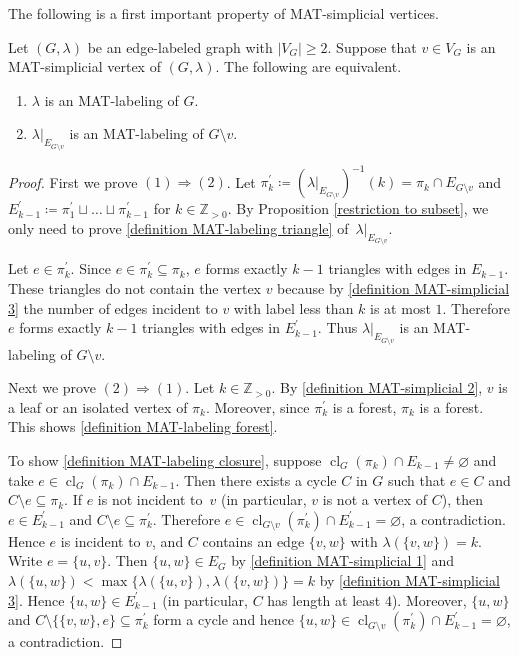\documentclass[ALCO, Unicode,published]{cedram}
\DeclareMathOperator{\cl}{cl}
\begin{document}
The following is a first important property of MAT-simplicial vertices.
\begin{proposition}\label{MAT-simplicial}
Let $ (G, \lambda) $ be an edge-labeled graph with $ |V_{G}| \geq 2 $. 
Suppose that $ v \in V_{G} $ is an MAT-simplicial vertex of $ (G,\lambda) $. 
The following are equivalent. 
\begin{enumerate}[(1)]
\item $ \lambda $ is an MAT-labeling of $ G $. 
\item $ \lambda|_{E_{G\setminus v}} $ is an MAT-labeling of $ G\setminus v $. 
\end{enumerate}
\end{proposition}
\begin{proof}
First we prove $ (1) \Rightarrow (2) $. 
Let $ \pi_{k}^{\prime} \coloneqq (\lambda|_{E_{G\setminus v}})^{-1}(k) =\pi_k \cap E_{G\setminus v}$ and $ E_{k-1}^{\prime} \coloneqq \pi^{\prime}_{1} \sqcup \dots \sqcup \pi^{\prime}_{k-1} $ for $ k \in \mathbb{Z}_{>0} $. 
By Proposition  \ref{restriction to subset}, we only need to prove \ref{definition MAT-labeling triangle} of~$ \lambda|_{E_{G\setminus v}} $.

Let $ e \in \pi_{k}^{\prime} $. 
Since $ e \in \pi_{k}^{\prime} \subseteq \pi_{k} $, $ e $ forms exactly $ k-1 $ triangles with edges in $ E_{k-1} $. 
These triangles do not contain the vertex $ v $ because by \ref{definition MAT-simplicial 3} the number of edges incident to $ v $ with label less than $ k $ is at most $ 1 $. 
Therefore $ e $ forms exactly $ k-1 $ triangles with edges in $ E_{k-1}^{\prime} $. 
Thus $ \lambda|_{E_{G\setminus v}} $ is an MAT-labeling of $ G\setminus v $. 

Next we prove $ (2) \Rightarrow (1) $. 
Let $ k \in \mathbb{Z}_{>0} $.
By  \ref{definition MAT-simplicial 2}, $ v $ is a leaf or  an isolated vertex of $ \pi_{k} $. 
Moreover, since $ \pi_{k}^{\prime} $ is a forest, $ \pi_{k} $ is a forest. 
This shows \ref{definition MAT-labeling forest}. 

To show \ref{definition MAT-labeling closure}, suppose $ \cl_{G}(\pi_{k}) \cap E_{k-1} \neq \varnothing $ and take $ e \in \cl_{G}(\pi_{k}) \cap E_{k-1} $. 
Then there exists a cycle $ C $ in $G$ such that $ e \in C $ and $ C \setminus e \subseteq \pi_{k} $. 
If $ e $ is not incident to~$ v $ (in particular, $v$ is not a vertex of $C$), then $ e \in E_{k-1}^{\prime} $ and $ C \setminus e \subseteq \pi_{k}^{\prime} $. 
Therefore $ e \in \cl_{G\setminus v}(\pi_{k}^{\prime}) \cap E_{k-1}^{\prime} = \varnothing$, a contradiction. 
Hence $ e $ is incident to $ v $, and $ C $ contains an edge $ \{v,w\} $ with $ \lambda(\{v,w\}) = k $. 
Write $ e = \{u,v\} $. 
Then $ \{u,w\} \in E_{G} $ by \ref{definition MAT-simplicial 1} and $ \lambda(\{u,w\}) < \max\{\lambda(\{u,v\}), \lambda(\{v,w\})\} = k $ by \ref{definition MAT-simplicial 3}. 
Hence $ \{u,w\} \in E_{k-1}^{\prime} $ (in particular, $C$ has length at least $4$).
Moreover,  $ \{u,w\}$ and $ C \setminus\{\{v,w\}, e\} \subseteq \pi_{k}^{\prime} $ form a cycle and hence $ \{u,w\} \in \cl_{G\setminus v}(\pi_{k}^{\prime}) \cap E_{k-1}^{\prime}= \varnothing$, a contradiction. 


\end{proof}
\end{document}
